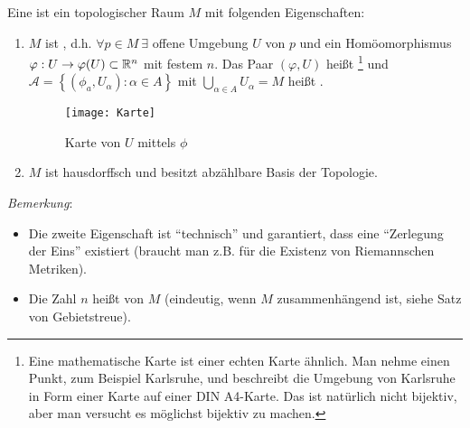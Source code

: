 \begin{definition}\label{def:topologischeMannigfaltigkeit}
  Eine  ist ein topologischer Raum \( M \) mit folgenden Eigenschaften:
  \begin{enumerate}
   \item \( M \) ist \label{def:lokalEuklidisch}, d.h. \( \forall p \in M \ \exists \) offene Umgebung \( U \) von \( p \) und ein Homöomorphismus \( \varphi: U \to \varphi(U) \subset \mathbb{R}^n \) mit festem \( n \). Das Paar \( (\varphi, U) \) heißt \label{def:karte}\footnote{Eine mathematische Karte ist einer echten Karte ähnlich. Man nehme einen Punkt, zum Beispiel Karlsruhe, und beschreibt die Umgebung von Karlsruhe in Form einer Karte auf einer DIN A4-Karte. Das ist natürlich nicht bijektiv, aber man versucht es möglichst bijektiv zu machen.} und \( \mathcal{A} = \left \{ (\phi_a, U_\alpha) : \alpha \in A \right \} \) mit \( \bigcup_{\alpha \in A}U_\alpha = M \) heißt \label{def:atlas}.
    \begin{figure}[H]
      \texttt{[image: Karte]}
      \caption{Karte von \( U \) mittels \( \phi \)}
    \end{figure}
   \item \( M \) ist hausdorffsch und besitzt abzählbare Basis der Topologie.
  \end{enumerate}
  \emph{Bemerkung}:
  \begin{itemize}
    \item Die zweite Eigenschaft ist ``technisch'' und garantiert, dass eine ``Zerlegung der Eins'' existiert (braucht man z.B. für die Existenz von Riemannschen Metriken). 
    \item Die Zahl \( n \) heißt \label{def:dimension} von \( M \) (eindeutig, wenn \( M \) zusammenhängend ist, siehe Satz von Gebietstreue). 
  \end{itemize}
\end{definition}

